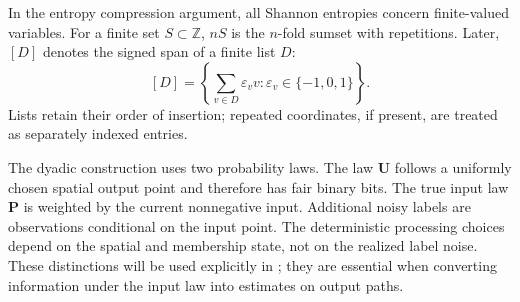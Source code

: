 In the entropy compression argument, all Shannon entropies concern
finite-valued variables. For a finite set $S\subset\mathbb Z$, $nS$
is the $n$-fold sumset with repetitions. Later, $[D]$ denotes the signed
span of a finite list $D$:
\[
 [D]=\left\{\sum_{v\in D}\varepsilon_v v:
                    \varepsilon_v\in\{-1,0,1\}\right\}.
\]
Lists retain their order of insertion; repeated coordinates, if
present, are treated as separately indexed entries.

The dyadic construction uses two probability laws. The law
$\mathbf U$ follows a uniformly chosen spatial output point and
therefore has fair binary bits. The true input law $\mathbf P$ is
weighted by the current nonnegative input. Additional noisy labels are
observations conditional on the input point. The deterministic
processing choices depend on the spatial and membership state, not on
the realized label noise. These distinctions will be used explicitly
in ; they are essential when converting information
under the input law into estimates on output paths.
